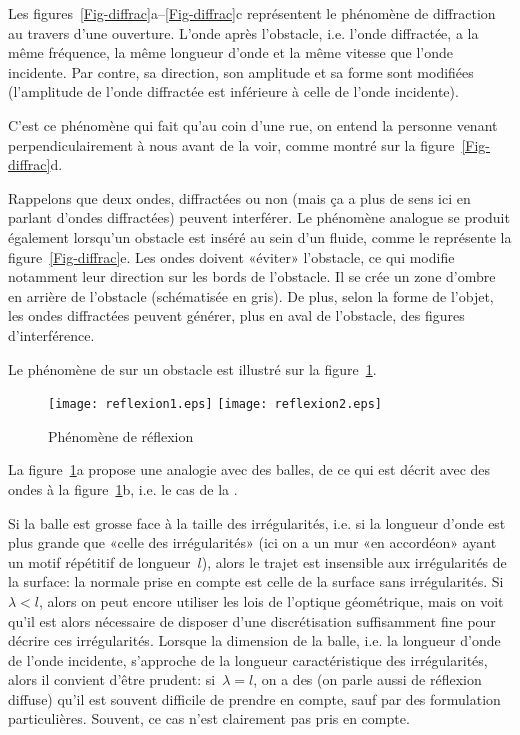 Les figures~\ref{Fig-diffrac}a--\ref{Fig-diffrac}c représentent le phénomène de diffraction au travers d'une ouverture. L'onde après l'obstacle, i.e. l'onde diffractée, a la même fréquence, la même longueur d'onde et la même vitesse que l'onde incidente. Par contre, sa direction, son amplitude et sa forme sont modifiées (l'amplitude de l'onde diffractée  est inférieure à celle de l'onde incidente). 

C'est ce phénomène qui fait qu'au coin d'une rue, on entend la personne venant perpendiculairement à nous avant de la voir, comme montré sur la figure~\ref{Fig-diffrac}d.

Rappelons que deux ondes, diffractées ou non (mais ça a plus de sens ici en parlant d'ondes diffractées) peuvent interférer.
Le phénomène analogue se produit également lorsqu'un obstacle est inséré au sein d'un fluide, comme le représente la figure~\ref{Fig-diffrac}e. Les ondes doivent «éviter» l'obstacle, ce qui modifie notamment leur direction sur les bords de l'obstacle.
Il se crée un zone d'ombre en arrière de l'obstacle (schématisée en gris).
De plus, selon la forme de l'objet, les ondes diffractées peuvent générer, plus en aval de l'obstacle, des figures d'interférence.

\medskip
Le phénomène de  sur un obstacle est illustré sur la figure~\ref{Fig-reflex}.
\begin{figure}[h!]
\centering
\texttt{[image: reflexion1.eps]}\hspace{2cm}
\texttt{[image: reflexion2.eps]}
\caption{Phénomène de réflexion}\label{Fig-reflex}
\end{figure}
La figure~\ref{Fig-reflex}a propose une analogie avec des balles, de ce qui est décrit avec des ondes à la figure~\ref{Fig-reflex}b, i.e. le cas de la .

Si la balle est grosse face à la taille des irrégularités, i.e. si la longueur d'onde est plus grande que «celle des irrégularités» (ici on a un mur «en accordéon» ayant un motif répétitif de longueur~$l$), alors le trajet est insensible aux irrégularités de la surface: la normale prise en compte est celle de la surface sans irrégularités. Si~$\lambda<l$, alors on peut encore utiliser les lois de l'optique géométrique, mais on voit qu'il est alors nécessaire de disposer d'une discrétisation suffisamment fine pour décrire ces irrégularités. Lorsque la dimension de la balle, i.e. la longueur d'onde de l'onde incidente, s'approche de la longueur caractéristique des irrégularités, alors il convient d'être prudent: si~$\lambda=l$, on a des  (on parle aussi de réflexion diffuse) qu'il est souvent difficile de prendre en compte, sauf par des formulation particulières. Souvent, ce cas n'est clairement pas pris en compte.


